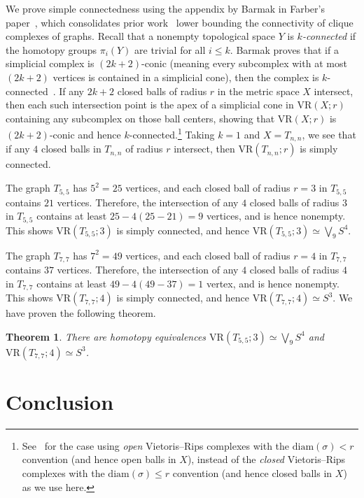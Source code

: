 \documentclass[12pt,a4paper]{amsart}
\newtheorem{theorem}{Theorem}[section]
\theoremstyle{definition}
\newcommand{\vr}[2]{\mathrm{VR}(#1;#2)}
\newcommand{\diam}{\ensuremath{\mathrm{diam}}}
\numberwithin{equation}{section}
\begin{document}
We prove simple connectedness using the appendix by Barmak in Farber's paper~\cite{farber2023large}, which consolidates prior work~\cite{meshulam2001clique,meshulam2003domination,chudnovsky2000systems,Kahle2009} lower bounding the connectivity of clique complexes of graphs.
Recall that a nonempty topological space $Y$ is \emph{$k$-connected} if the homotopy groups $\pi_i(Y)$ are trivial for all $i\le k$.
Barmak proves that if a simplicial complex is $(2k+2)$-conic (meaning every subcomplex with at most $(2k+2)$ vertices is contained in a simplicial cone), then the complex is $k$-connected~\cite[Appendix, Theorem~4]{farber2023large}.
If any $2k+2$ closed balls of radius $r$ in the metric space $X$ intersect, then each such intersection point is the apex of a simplicial cone in $\vr{X}{r}$ containing any subcomplex on those ball centers, showing that $\vr{X}{r}$ is $(2k+2)$-conic and hence $k$-connected.\footnote{See~\cite[Corollary~4.4]{adams2024connectivity} for the case using \emph{open} Vietoris--Rips complexes with the $\diam(\sigma)<r$ convention (and hence open balls in $X$), instead of the \emph{closed} Vietoris--Rips complexes with the $\diam(\sigma)\le r$ convention (and hence closed balls in $X$) as we use here.}
Taking $k=1$ and $X=T_{n,n}$, we see that if any $4$ closed balls in $T_{n,n}$ of radius $r$ intersect, then $\vr{T_{n,n}}{r}$ is simply connected.

The graph $T_{5,5}$ has $5^2=25$ vertices, and each closed ball of radius $r=3$ in $T_{5,5}$ contains $21$ vertices.
Therefore, the intersection of any $4$ closed balls of radius $3$ in $T_{5,5}$ contains at least $25-4(25-21)=9$ vertices, and is hence nonempty.
This shows $\vr{T_{5,5}}{3}$ is simply connected, and hence $\vr{T_{5,5}}{3}\simeq \bigvee_9 S^4$.

The graph $T_{7,7}$ has $7^2=49$ vertices, and each closed ball of radius $r=4$ in $T_{7,7}$ contains $37$ vertices.
Therefore, the intersection of any $4$ closed balls of radius $4$ in $T_{7,7}$ contains at least $49-4(49-37)=1$ vertex, and is hence nonempty.
This shows $\vr{T_{7,7}}{4}$ is simply connected, and hence $\vr{T_{7,7}}{4}\simeq S^3$.
We have proven the following theorem.

\begin{theorem}
\label{thm:homotopy-through-homology}
There are homotopy equivalences $\vr{T_{5,5}}{3}\simeq \bigvee_9 S^4$ and $\vr{T_{7,7}}{4}\simeq S^3$.
\end{theorem}



\section{Conclusion}
\label{sec:conclusion}
\end{document}
